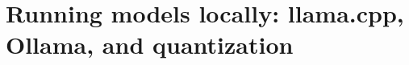 \chapter{Running models locally: llama.cpp, Ollama, and quantization}
\label{ch:running-models-locally-llama-cpp-ollama}

